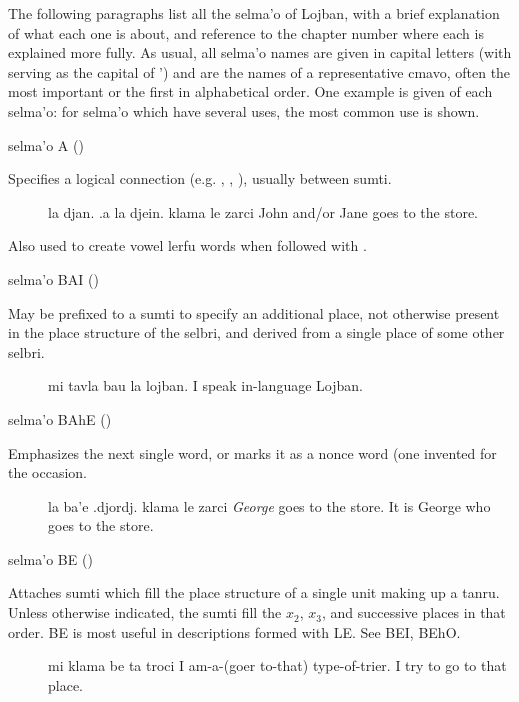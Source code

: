 The following paragraphs list all the selma'o of Lojban,
    with a brief explanation of what each one is about, and
    reference to the chapter number where each is explained more
    fully. As usual, all selma'o names are given in capital letters
    (with  serving as the capital of \q{}') and are the names
    of a representative cmavo, often the most important or the
    first in alphabetical order. One example is given of each
    selma'o: for selma'o which have several uses, the most common
    use is shown.

selma'o A ()

Specifies a logical connection (e.g. , ,
    ), usually between sumti.
\begin{description}
\item[] la djan. .a la djein. klama le zarci John and/or Jane goes to the store.

\end{description}

Also used to create vowel lerfu words when followed with
    .

selma'o BAI ()

May be prefixed to a sumti to specify an additional place,
    not otherwise present in the place structure of the selbri, and
    derived from a single place of some other selbri.
\begin{description}
\item[] mi tavla bau la lojban. I speak in-language Lojban.
\end{description}

selma'o BAhE () 

Emphasizes the next single word, or marks it as a nonce word
    (one invented for the occasion.
\begin{description}
\item[] la ba'e .djordj. klama le zarci \textit{George} goes to the store. It is George who goes to the store.
\end{description}

selma'o BE () 

Attaches sumti which fill the place structure of a single
    unit making up a tanru. Unless otherwise indicated, the sumti
    fill the $x_2$, $x_3$, and successive places in that order. BE is
    most useful in descriptions formed with LE. See BEI, BEhO.
\begin{description}
\item[] mi klama be ta troci I am-a-(goer to-that) type-of-trier. I try to go to that place.
\end{description}

